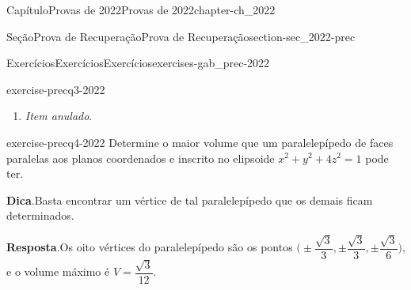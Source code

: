 \documentclass[oneside,10pt,]{book}
\newcommand{\blocktitlefont}{\relax}
\newcommand{\xreffont}{\relax}
\numberwithin{equation}{section}
\newcommand{\R}{\mathbb R}
\newcommand{\amp}{&}
\begin{document}
\begin{chapterptx}{Capítulo}{Provas de 2022}{}{Provas de 2022}{}{}{chapter-ch_2022}
\begin{sectionptx}{Seção}{Prova de Recuperação}{}{Prova de Recuperação}{}{}{section-sec_2022-prec}
\begin{exercises-subsection-numberless}{Exercícios}{Exercícios}{}{Exercícios}{}{}{exercises-gab_prec-2022}
\begin{divisionexercise}{3}{}{}{exercise-precq3-2022}
\begin{enumerate}[label=\alph*.]
g(1,2)\). Tendo o ponto e esta direção conseguimos construir a equação da reta pedida. Vamos determinar o gradiente de \(g\) em termos do gradiente de \(f\), usando a Regra da Cadeia (\hyperref[corollary-cor_cadeiaturbo]{Corolário~{\xreffont\ref{corollary-cor_cadeiaturbo}}}), pensando em \(f=f(u,v)\), com \(u(x,y)=x^2+2y\) e \(v(x,y)=x-y^2\), temos:%
\begin{align*}
g_x(x,y)\amp
=2xf_u(x^2+2y,x-y^2)+f_v(x^2+2y,x-y^2)\\
g_y(x,y)\amp
=2f_u(x^2+2y,x-y^2)-2yf_v(x^2+2y,x-y^2).
\end{align*}
%
\par
Fazendo \((x,y)=(1,2)\), temos \((u,v)=(5,-3)\). Além disso, a condição de paralelismo do primeiro parágrafo nos diz que \(f_u(5,-3)=f_v(5,-3)\). Chamemos esse valor de \(a=f_u(5,-3)\). Isto, nas equações acima, dá:%
\begin{align*}
g_x(1,2)\amp =2f_u(5,-3)+f_v(5,-3)=3a\\
g_y(1,2)\amp =2f_u(5,-3)-4f_v(5,-3)=-2a.
\end{align*}
%
\par
Assim, \(\nabla g(1,2)=(3a,-2a)\), que é paralelo ao vetor \((3,-2)\). Desta forma, a reta normal pedida é%
\begin{equation*}
\boxed{r\colon
(x,y)=(1,2)+\lambda (3,-2),\quad\lambda\in\R}.
\end{equation*}
%
\item{}\emph{Item anulado}.%
\end{enumerate}
\end{divisionexercise}%
\begin{divisionexercise}{4}{}{}{exercise-precq4-2022}%
Determine o maior volume que um paralelepípedo de faces paralelas aos planos coordenados e inscrito no elipsoide \(x^2+y^2 +4z^2 =1\) pode ter.%
\par\smallskip%
\noindent\textbf{\blocktitlefont Dica}.\hypertarget{hint-precq4-2022-b}{}\quad{}Basta encontrar um vértice de tal paralelepípedo que os demais ficam determinados.\par\smallskip%
\noindent\textbf{\blocktitlefont Resposta}.\hypertarget{answer-precq4-2022-c}{}\quad{}Os oito vértices do paralelepípedo são os pontos \(\Big(\pm\dfrac{\sqrt{3}}{3},\pm\dfrac{\sqrt{3}}{3},
\pm\dfrac{\sqrt{3}}{6}\Big)\), e o volume máximo é \(V=\dfrac{\sqrt{3}}{12}\).%
\par\smallskip%

\end{divisionexercise}
\end{exercises-subsection-numberless}
\end{sectionptx}
\end{chapterptx}
\end{document}
